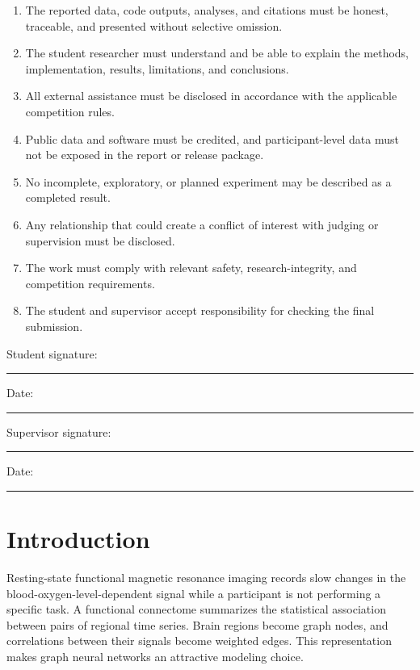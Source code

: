 \documentclass[11pt,a4paper]{article}
\begin{document}
\begin{enumerate}[label=\arabic*.,leftmargin=2.2em]
  \item The reported data, code outputs, analyses, and citations must be honest,
  traceable, and presented without selective omission.
  \item The student researcher must understand and be able to explain the
  methods, implementation, results, limitations, and conclusions.
  \item All external assistance must be disclosed in
  accordance with the applicable competition rules.
  \item Public data and software must be credited, and participant-level data
  must not be exposed in the report or release package.
  \item No incomplete, exploratory, or planned experiment may be described as a
  completed result.
  \item Any relationship that could create a conflict of interest with judging
  or supervision must be disclosed.
  \item The work must comply with relevant safety, research-integrity, and
  competition requirements.
  \item The student and supervisor accept responsibility for checking the final
  submission.
\end{enumerate}

\vspace{1.2cm}
\noindent Student signature: \rule{7.2cm}{0.4pt}\hfill Date: \rule{3.0cm}{0.4pt}

\vspace{1.2cm}
\noindent Supervisor signature: \rule{6.6cm}{0.4pt}\hfill Date: \rule{3.0cm}{0.4pt}

\clearpage
\tableofcontents
\clearpage

\setcounter{page}{1}

\section{Introduction}

Resting-state functional magnetic resonance imaging records slow changes in
the blood-oxygen-level-dependent signal while a participant is not performing
a specific task. A functional connectome summarizes the statistical
association between pairs of regional time series. Brain regions become graph
nodes, and correlations between their signals become weighted edges. This
representation makes graph neural networks an attractive modeling choice.
\end{document}
